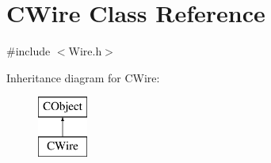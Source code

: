 \hypertarget{classCWire}{}\section{C\+Wire Class Reference}
\label{classCWire}


{\ttfamily \#include $<$Wire.\+h$>$}

Inheritance diagram for C\+Wire\+:\begin{figure}[H]
\begin{center}
\leavevmode
\includegraphics[height=2.000000cm]{classCWire}
\end{center}
\end{figure}
